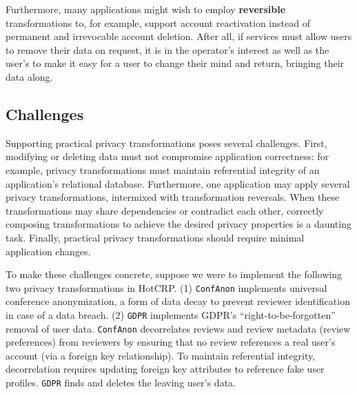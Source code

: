 Furthermore, many applications might wish to employ \textbf{reversible} transformations to, for
example, support account reactivation instead of permanent and irrevocable account deletion.
%
After all, if services must allow users to remove their data on request, it is in the operator's
interest as well as the user's to make it easy for a user to change their mind and return, bringing
their data along.
%
%
%
%

%
%

\subsection{Challenges}
%
Supporting practical privacy transformations poses several challenges. First, modifying
or deleting data must not compromise application correctness: for example, privacy transformations
must maintain referential integrity of an application's relational database.
%
Furthermore, one application may apply several privacy transformations, intermixed with
transformation reversals.  When these transformations may share dependencies or contradict each
other, correctly composing transformations to achieve the desired privacy properties is a daunting
task.
%
Finally, practical privacy transformations should require minimal application changes.
%

%
To make these challenges concrete, suppose we were to implement the following two privacy
transformations in HotCRP. 
%
(1) \texttt{ConfAnon} implements universal conference anonymization, a form of data decay to
prevent reviewer identification in case of a data breach.
%
(2) \texttt{GDPR} implements GDPR's ``right-to-be-forgotten'' removal of user data.
%
\texttt{ConfAnon} decorrelates reviews and review metadata (\eg review preferences) from reviewers
by ensuring that no review references a real user's account (via a foreign key relationship).
To maintain referential integrity, decorrelation requires updating foreign key
attributes to reference fake user profiles.
\texttt{GDPR} finds and deletes the leaving user's data.
%

